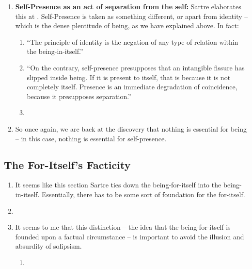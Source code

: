 \begin{enumerate}
\begin{enumerate}
  \end{enumerate}
  \item \textbf{Self-Presence as an act of separation from the self:} Sartre elaborates this at \autocite[127]{sartre}. Self-Presence is taken as something different, or apart from identity -- which is the dense plentitude of being, as we have explained above. In fact:
  \begin{enumerate}
    \item \enquote{The principle of identity is the negation of any type of relation within the being-in-itself.}
    \item \enquote{On the contrary, self-presence presupposes that an intangible fissure has slipped inside being. If it is present to itself, that is because it is not completely itself. Presence is an immediate degradation of coincidence, because it presupposes separation.}
    \item {}
  \end{enumerate}
  \item So once again, we are back at the discovery that nothing is essential for being -- in this case, nothing is essential for self-presence.
\end{enumerate}

\subsection{The For-Itself's Facticity}

\begin{enumerate}
  \item It seems like this section Sartre ties down the being-for-itself into the being-in-itself. Essentially, there has to be some sort of foundation for the for-itself.
  \item {}
  \item It seems to me that this distinction -- the idea that the being-for-itself is founded upon a factual circumstance -- is important to avoid the illusion and absurdity of solipsism.
  \begin{enumerate}
    \item {}
  \end{enumerate}
\end{enumerate}

